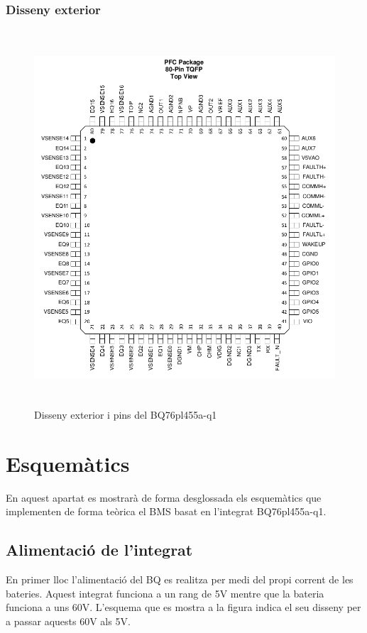\subsubsection{Disseny exterior}
\begin{figure}[H]
	\centering
    \includegraphics[width=\textwidth, height=14cm] {Prototip/layout.png}
    \caption{Disseny exterior i pins del BQ76pl455a-q1}
\end{figure}

\section{Esquemàtics}

En aquest apartat es mostrarà de forma desglossada els esquemàtics que implementen de forma teòrica el BMS basat en l'integrat BQ76pl455a-q1.

\subsection{Alimentació de l'integrat}
En primer lloc l'alimentació del BQ es realitza per medi del propi corrent de les bateries. Aquest integrat funciona a un rang de 5V mentre que la bateria funciona a uns 60V. L'esquema que es mostra a la figura indica el seu disseny per a passar aquests 60V als 5V. 

